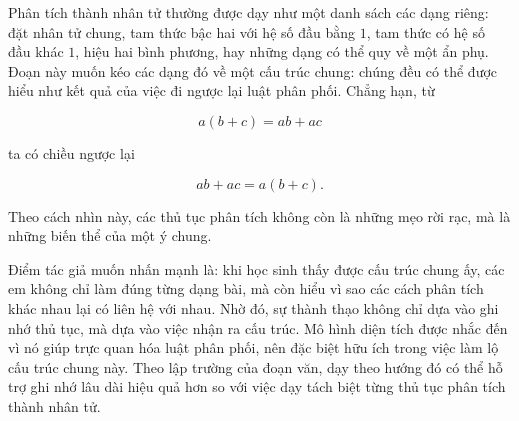 \documentclass[
  10pt,
  a4paper,
  landscape,
  twoside,
  openany
]{scrbook}
\newcommand{\NOTE}[1]{#1}
\begin{document}
{
\NOTE{Phân tích thành nhân tử thường được dạy như một danh sách các dạng riêng: đặt nhân tử chung, tam thức bậc hai với hệ số đầu bằng $1$, tam thức có hệ số đầu khác $1$, hiệu hai bình phương, hay những dạng có thể quy về một ẩn phụ. Đoạn này muốn kéo các dạng đó về một cấu trúc chung: chúng đều có thể được hiểu như kết quả của việc đi ngược lại luật phân phối. Chẳng hạn, từ

$$
a(b+c)=ab+ac
$$

ta có chiều ngược lại

$$
ab+ac=a(b+c).
$$

Theo cách nhìn này, các thủ tục phân tích không còn là những mẹo rời rạc, mà là những biến thể của một ý chung.

Điểm tác giả muốn nhấn mạnh là: khi học sinh thấy được cấu trúc chung ấy, các em không chỉ làm đúng từng dạng bài, mà còn hiểu vì sao các cách phân tích khác nhau lại có liên hệ với nhau. Nhờ đó, sự thành thạo không chỉ dựa vào ghi nhớ thủ tục, mà dựa vào việc nhận ra cấu trúc. Mô hình diện tích được nhắc đến vì nó giúp trực quan hóa luật phân phối, nên đặc biệt hữu ích trong việc làm lộ cấu trúc chung này. Theo lập trường của đoạn văn, dạy theo hướng đó có thể hỗ trợ ghi nhớ lâu dài hiệu quả hơn so với việc dạy tách biệt từng thủ tục phân tích thành nhân tử.}
}
\end{document}
